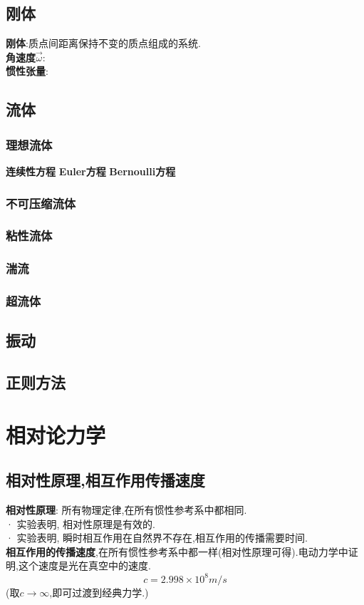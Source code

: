 \documentclass{article}
\begin{document}
\subsection{刚体}
\textbf{刚体}:质点间距离保持不变的质点组成的系统.\\
\textbf{角速度$\vec \omega$}:\\
\textbf{惯性张量}:



\subsection{流体}
\subsubsection{理想流体}
\textbf{连续性方程}
\textbf{Euler方程}
\textbf{Bernoulli方程}
\subsubsection{不可压缩流体}
\subsubsection{粘性流体}
\subsubsection{湍流}
\subsubsection{超流体}



\subsection{振动}



\subsection{正则方法}



\section{相对论力学}
\subsection{相对性原理,相互作用传播速度}
\textbf{相对性原理}: 所有物理定律,在所有惯性参考系中都相同.\\
· 实验表明, 相对性原理是有效的.\\
· 实验表明, 瞬时相互作用在自然界不存在,相互作用的传播需要时间.\\
\textbf{相互作用的传播速度},在所有惯性参考系中都一样(相对性原理可得).\quad 电动力学中证明,这个速度是光在真空中的速度.
\[c = 2.998 \times 10^8 m/s\]
(取$c\to \infty$,即可过渡到经典力学.)\\
\end{document}
